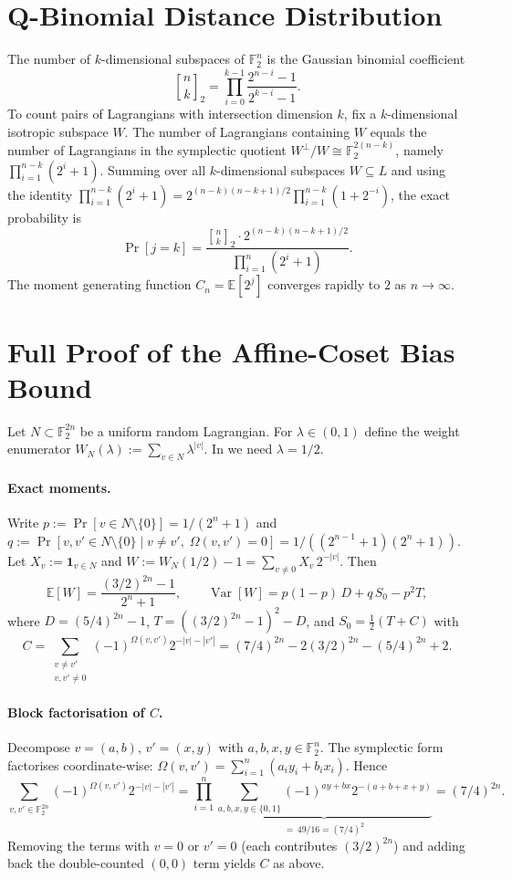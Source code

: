 \documentclass[11pt,a4paper]{article}
\theoremstyle{plain}
\theoremstyle{definition}
\newcommand{\F}{\mathbb{F}}
\newcommand{\E}{\mathbb{E}}
\DeclareMathOperator{\Var}{Var}
\begin{document}
\section{Q-Binomial Distance Distribution}
\label{app:qbin}

The number of $k$-dimensional subspaces of $\F_2^n$ is the Gaussian binomial coefficient
\[
{n \brack k}_2 = \prod_{i=0}^{k-1} \frac{2^{n-i}-1}{2^{k-i}-1}.
\]
To count pairs of Lagrangians with intersection dimension $k$, fix a $k$-dimensional isotropic subspace $W$. The number of Lagrangians containing $W$ equals the number of Lagrangians in the symplectic quotient $W^\perp / W \cong \F_2^{2(n-k)}$, namely $\prod_{i=1}^{n-k}(2^i+1)$. Summing over all $k$-dimensional subspaces $W \subseteq L$ and using the identity $\prod_{i=1}^{n-k}(2^i+1) = 2^{(n-k)(n-k+1)/2} \prod_{i=1}^{n-k}(1+2^{-i})$, the exact probability is
\[
\Pr[j=k] = \frac{{n \brack k}_2 \cdot 2^{(n-k)(n-k+1)/2}}{\prod_{i=1}^n (2^i+1)}.
\]
The moment generating function $C_n = \E[2^j]$ converges rapidly to $2$ as $n \to \infty$.

\section{Full Proof of the Affine-Coset Bias Bound}
\label{app:krawtchouk}

Let $N \subset \F_2^{2n}$ be a uniform random Lagrangian.  For $\lambda \in (0,1)$ define the weight enumerator $W_N(\lambda) := \sum_{v \in N} \lambda^{|v|}$.  In  we need $\lambda=1/2$.

\paragraph{Exact moments.}  Write $p := \Pr[v \in N \setminus \{0\}] = 1/(2^n+1)$ and $q := \Pr[v,v' \in N \setminus \{0\} \mid v \neq v',\; \Omega(v,v')=0] = 1/((2^{n-1}+1)(2^n+1))$.  Let $X_v := \mathbf{1}_{v \in N}$ and $W := W_N(1/2)-1 = \sum_{v \neq 0} X_v\,2^{-|v|}$.  Then
\[
\E[W] = \frac{(3/2)^{2n}-1}{2^n+1}, \qquad
\Var[W] = p(1-p)\,D + q\,S_0 - p^2 T,
\]
where $D = (5/4)^{2n}-1$, $T = ((3/2)^{2n}-1)^2-D$, and $S_0 = \tfrac12(T+C)$ with
\[
C = \sum_{\substack{v\neq v'\\ v,v'\neq 0}} (-1)^{\Omega(v,v')}2^{-|v|-|v'|}
  = (7/4)^{2n} - 2(3/2)^{2n} - (5/4)^{2n} + 2.
\]

\paragraph{Block factorisation of $C$.}  Decompose $v=(a,b)$, $v'=(x,y)$ with $a,b,x,y \in \F_2^n$.  The symplectic form factorises coordinate-wise: $\Omega(v,v') = \sum_{i=1}^n (a_i y_i + b_i x_i)$.  Hence
\[
\sum_{v,v' \in \F_2^{2n}} (-1)^{\Omega(v,v')} 2^{-|v|-|v'|}
= \prod_{i=1}^n \underbrace{\sum_{a,b,x,y\in\{0,1\}} (-1)^{ay+bx} 2^{-(a+b+x+y)}}_{=\,49/16 = (7/4)^2}
= (7/4)^{2n}.
\]
Removing the terms with $v=0$ or $v'=0$ (each contributes $(3/2)^{2n}$) and adding back the double-counted $(0,0)$ term yields $C$ as above.
\end{document}
